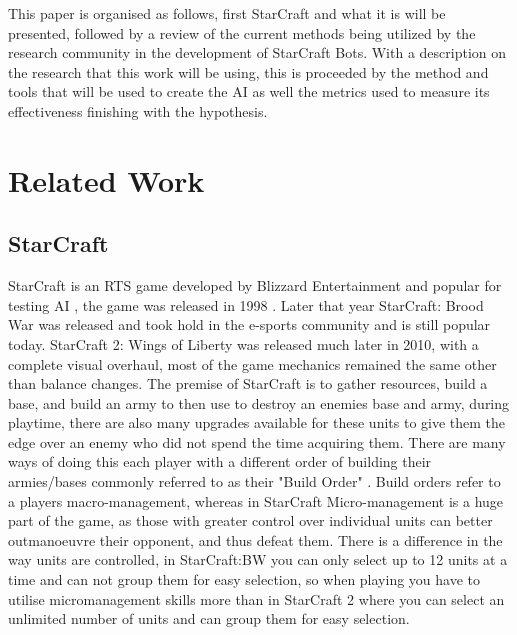 \documentclass[journal]{IEEEtran}
\begin{document}
	This paper is organised as follows, first StarCraft and what it is will be presented, followed by a review of the current methods being utilized by the research community in the development of StarCraft Bots. With a description on the research that this work will be using, this is proceeded by the method and tools that will be used to create the AI as well the metrics used to measure its effectiveness finishing with the hypothesis. 
	
	
	\section{Related Work}
	\subsection{StarCraft}
	StarCraft is an RTS game developed by Blizzard Entertainment \cite{Blizzard} and popular for testing AI \cite{Current}, the game was released in 1998 \cite{Release}. Later that year StarCraft: Brood War was released and took hold in the e-sports community and is still popular today. StarCraft 2: Wings of Liberty was released much later in 2010, with a complete visual overhaul, most of the game mechanics remained the same other than balance changes. The premise of StarCraft is to gather resources, build a base, and build an army to then use to destroy an enemies base and army, during playtime, there are also many upgrades available for these units to give them the edge over an enemy who did not spend the time acquiring them. There are many ways of doing this each player with a different order of building their armies/bases commonly referred to as their "Build Order" \cite{BuildOrder}. Build orders refer to a players macro-management, whereas in StarCraft Micro-management is a huge part of the game, as those with greater control over individual units can better outmanoeuvre their opponent, and thus defeat them. There is a difference in the way units are controlled, in StarCraft:BW you can only select up to 12 units at a time and can not group them for easy selection, so when playing you have to utilise micromanagement skills more than in StarCraft 2 where you can select an unlimited number of units and can group them for easy selection.
\end{document}
